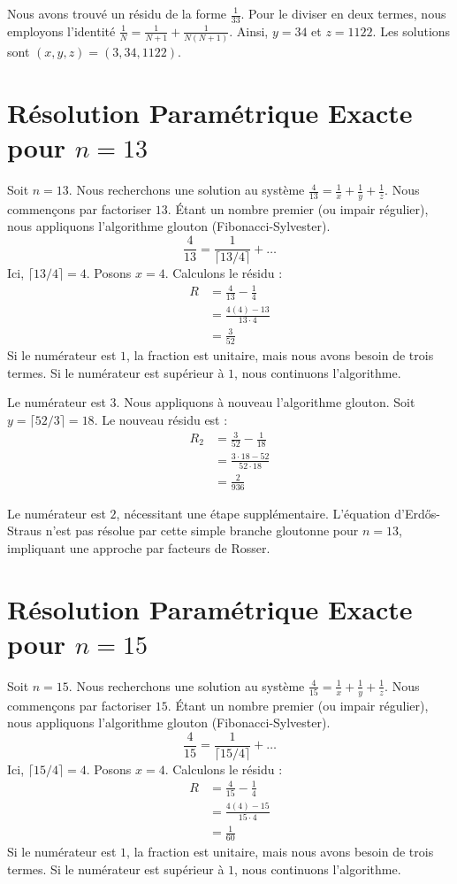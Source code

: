 \documentclass[11pt,a4paper]{article}
\begin{document}
Nous avons trouvé un résidu de la forme $\frac{1}{33}$. Pour le diviser en deux termes, nous employons l'identité $\frac{1}{N} = \frac{1}{N+1} + \frac{1}{N(N+1)}$.
Ainsi, $y = 34$ et $z = 1122$.
Les solutions sont $(x, y, z) = (3, 34, 1122)$.

\section{Résolution Paramétrique Exacte pour $n = 13$}
Soit $n = 13$. Nous recherchons une solution au système $\frac{4}{13} = \frac{1}{x} + \frac{1}{y} + \frac{1}{z}$.
Nous commençons par factoriser $13$. Étant un nombre premier (ou impair régulier), nous appliquons l'algorithme glouton (Fibonacci-Sylvester).
\begin{equation}
\frac{4}{13} = \frac{1}{\lceil 13/4 \rceil} + \ldots
\end{equation}
Ici, $\lceil 13/4 \rceil = 4$. Posons $x = 4$.
Calculons le résidu :
\begin{align*}
R &= \frac{4}{13} - \frac{1}{4} \\
&= \frac{4(4) - 13}{13 \cdot 4} \\
&= \frac{3}{52}
\end{align*}
Si le numérateur est $1$, la fraction est unitaire, mais nous avons besoin de trois termes. Si le numérateur est supérieur à $1$, nous continuons l'algorithme.

Le numérateur est $3$. Nous appliquons à nouveau l'algorithme glouton.
Soit $y = \lceil 52/3 \rceil = 18$.
Le nouveau résidu est :
\begin{align*}
R_2 &= \frac{3}{52} - \frac{1}{18} \\
&= \frac{3 \cdot 18 - 52}{52 \cdot 18} \\
&= \frac{2}{936}
\end{align*}

Le numérateur est $2$, nécessitant une étape supplémentaire. L'équation d'Erd\H{o}s-Straus n'est pas résolue par cette simple branche gloutonne pour $n=13$, impliquant une approche par facteurs de Rosser.

\section{Résolution Paramétrique Exacte pour $n = 15$}
Soit $n = 15$. Nous recherchons une solution au système $\frac{4}{15} = \frac{1}{x} + \frac{1}{y} + \frac{1}{z}$.
Nous commençons par factoriser $15$. Étant un nombre premier (ou impair régulier), nous appliquons l'algorithme glouton (Fibonacci-Sylvester).
\begin{equation}
\frac{4}{15} = \frac{1}{\lceil 15/4 \rceil} + \ldots
\end{equation}
Ici, $\lceil 15/4 \rceil = 4$. Posons $x = 4$.
Calculons le résidu :
\begin{align*}
R &= \frac{4}{15} - \frac{1}{4} \\
&= \frac{4(4) - 15}{15 \cdot 4} \\
&= \frac{1}{60}
\end{align*}
Si le numérateur est $1$, la fraction est unitaire, mais nous avons besoin de trois termes. Si le numérateur est supérieur à $1$, nous continuons l'algorithme.
\end{document}
